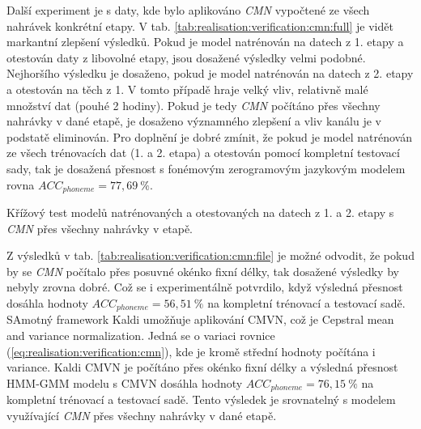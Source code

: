 Další experiment je s daty, kde bylo aplikováno \textit{CMN} vypočtené ze všech nahrávek konkrétní etapy. V tab. \ref{tab:realisation:verification:cmn:full} je vidět markantní zlepšení výsledků. Pokud je model natrénován na datech z 1. etapy a otestován daty z libovolné etapy, jsou dosažené výsledky velmi podobné. Nejhoršího výsledku je dosaženo, pokud je model natrénován na datech z 2. etapy a otestován na těch z 1. V tomto případě hraje velký vliv, relativně malé množství dat (pouhé 2 hodiny). Pokud je tedy \textit{CMN} počítáno přes všechny nahrávky v dané etapě, je dosaženo významného zlepšení a vliv kanálu je v podstatě eliminován. Pro doplnění je dobré zmínit, že pokud je model natrénován ze všech trénovacích dat (1. a 2. etapa) a otestován pomocí kompletní testovací sady, tak je dosažená přesnost s fonémovým zerogramovým jazykovým modelem rovna $ACC_{phoneme} = 77,69\ \%$.


\begin{table}[htpb]
  \centering
  \def\arraystretch{1.5}
  \caption{Křížový test modelů natrénovaných a otestovaných na datech z 1. a 2. etapy s \textit{CMN}  přes všechny nahrávky v etapě.}
  \label{tab:realisation:verification:cmn:full}
\end{table}

Z výsledků v tab. \ref{tab:realisation:verification:cmn:file} je možné odvodit, že pokud by se \textit{CMN} počítalo přes posuvné okénko fixní délky, tak dosažené výsledky by nebyly zrovna dobré. Což se i experimentálně potvrdilo, když výsledná přesnost dosáhla hodnoty $ACC_{phoneme} = 56,51\ \%$ na kompletní trénovací a testovací sadě. SAmotný framework Kaldi umožňuje aplikování CMVN, což je Cepstral mean and variance normalization. Jedná se o variaci rovnice (\ref{eq:realisation:verification:cmn}), kde je kromě střední hodnoty počítána i variance. Kaldi CMVN je počítáno přes okénko fixní délky a výsledná přesnost HMM-GMM modelu s CMVN dosáhla hodnoty $ACC_{phoneme} = 76,15\ \%$ na kompletní trénovací a testovací sadě. Tento výsledek je srovnatelný s modelem využívající \textit{CMN} přes všechny nahrávky v dané etapě.

